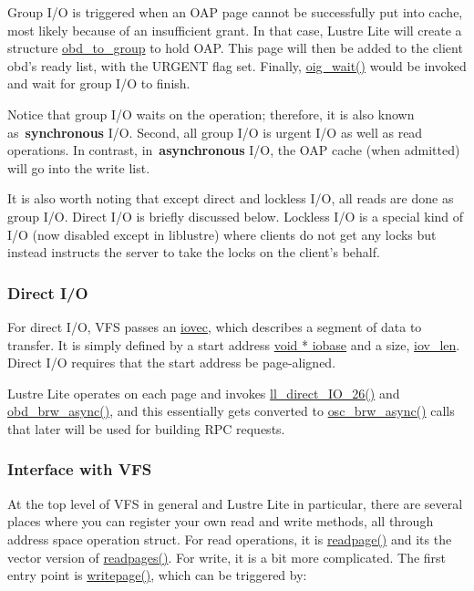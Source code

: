 Group I/O is triggered when an OAP page cannot be successfully
put into cache, most likely because of an insufficient grant. In that case,
Lustre Lite will create a structure \url{obd_to_group} to hold OAP. This page
will then be added to the client obd's ready list, with the URGENT flag set.
Finally, \url{oig_wait()} would be invoked and wait for group I/O to finish. 

Notice that group I/O waits on the operation; therefore, it is also known
as~\textbf{synchronous} I/O. Second, all group I/O is urgent I/O as well as
read operations.  In contrast, in~\textbf{asynchronous} I/O, the OAP cache
(when admitted) will go into the write list.

It is also worth noting that except direct and lockless I/O, all reads are done
as group I/O. Direct I/O is briefly discussed below. Lockless I/O is a special
kind of I/O (now disabled except in liblustre) where clients do not get any
locks but instead instructs the server to take the locks on the client's
behalf.

\subsubsection{Direct I/O}

For direct I/O, VFS passes an \url{iovec}, which describes a segment of data to
transfer. It is simply defined by a start address \url{void * iobase} and a
size, \url{iov_len}. Direct I/O requires that the start address
be page-aligned.

Lustre Lite operates on each page and invokes \url{ll_direct_IO_26()} and
\url{obd_brw_async()}, and this essentially gets converted to
\url{osc_brw_async()} calls that later will be used for building RPC requests.


\subsubsection{Interface with VFS}

At the top level of VFS in general and Lustre Lite in particular, there are
several places where you can register your own read and write methods, all
through address space operation struct. For read operations, it is
\url{readpage()} and its the vector version of \url{readpages()}. For write, it
is a bit more complicated.  The first entry point is \url{writepage()}, which
can be triggered by:

